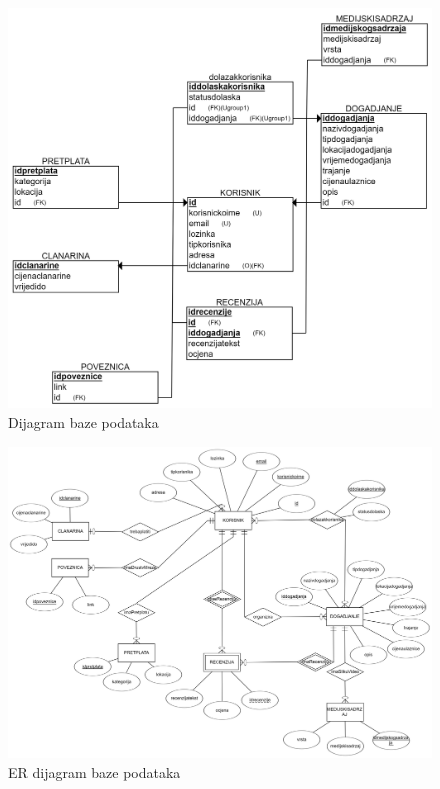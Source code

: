 				\begin{figure}[H]
					\includegraphics[width=\textwidth]{dijagrami/db_REL.png} 
					\centering
					\caption{Dijagram baze podataka}
					\label{fig:promjene}
				\end{figure}
				
				\newpage
				
				\begin{figure}[H]
					\includegraphics[width=\textwidth]{dijagrami/db_ER.png} 
					\centering
					\caption{ER dijagram baze podataka}
					\label{fig:promjene}
				\end{figure}
				
